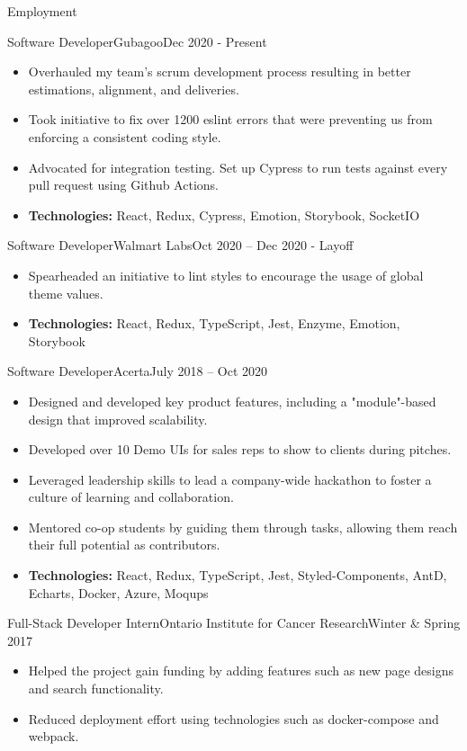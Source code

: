 \documentclass[]{mcdowellcv}
\begin{document}
	\begin{cvsection}{Employment}
		\begin{cvsubsection}{Software Developer}{Gubagoo}{Dec 2020 - Present}
 			\begin{itemize}
				\item Overhauled my team's scrum development process resulting in better estimations, alignment, and deliveries.
				\item Took initiative to fix over 1200 eslint errors that were preventing us from enforcing a consistent coding style.
				\item Advocated for integration testing. Set up Cypress to run tests against every pull request using Github Actions.
				\item \textbf{Technologies:} React, Redux, Cypress, Emotion, Storybook, SocketIO
			\end{itemize}
		\end{cvsubsection}
		\begin{cvsubsection}{Software Developer}{Walmart Labs}{Oct 2020 -- Dec 2020 - Layoff}
			\begin{itemize}
				\item Spearheaded an initiative to lint styles to encourage the usage of global theme values.
				\item \textbf{Technologies:} React, Redux, TypeScript, Jest, Enzyme, Emotion, Storybook
			\end{itemize}
		\end{cvsubsection}
		\begin{cvsubsection}{Software Developer}{Acerta}{July 2018 -- Oct 2020}
			\begin{itemize}
				\item Designed and developed key product features, including a "module"-based design that improved scalability.
				\item Developed over 10 Demo UIs for sales reps to show to clients during pitches.
				\item Leveraged leadership skills to lead a company-wide hackathon to foster a culture of learning and collaboration.
				\item Mentored co-op students by guiding them through tasks, allowing them reach their full potential as contributors.
				\item \textbf{Technologies:} React, Redux, TypeScript, Jest, Styled-Components, AntD, Echarts, Docker, Azure, Moqups
			\end{itemize}
		\end{cvsubsection}

		\begin{cvsubsection}{Full-Stack Developer Intern}{Ontario Institute for Cancer Research}{Winter \& Spring 2017}
			\begin{itemize}
				\item Helped the project gain funding by adding features such as new page designs and search functionality.
				\item Reduced deployment effort using technologies such as docker-compose and webpack.
			\end{itemize}
		\end{cvsubsection}
	\end{cvsection}
\end{document}
